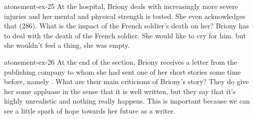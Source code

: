 \documentclass[preview]{standalone}
\begin{document}
\begin{snippetexercise}{atonement-ex-25}
    {At the hospital, Briony deals with increasingly more severe injuries and her mental and physical
    strength is tested. She even acknowledges that  (286). What is the impact of the French soldier's death on her?}
    Briony has to deal with the death of the French soldier. She would like to cry for him.
    but she wouldn't feel a thing, she was empty.
\end{snippetexercise}

\begin{snippetexercise}{atonement-ex-26}
    {At the end of the section, Briony receives a letter from the publishing company to whom she had
    sent one of her short stories some time before, namely . What are their
    main criticisms of Briony's story?}
    They do give her some appluase in the sense that it is well written,
    but they say that it's highly unrealistic and nothing really happens.
    This is important because we can see a little spark of hope towards her future as a writer.
\end{snippetexercise}
\end{document}
